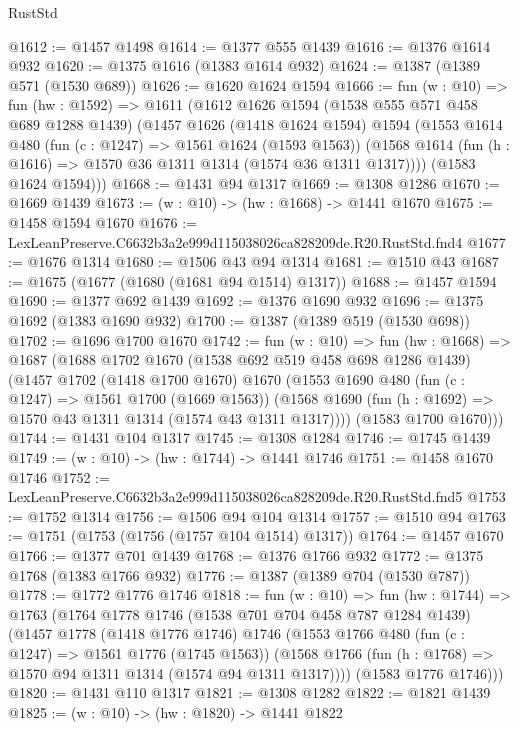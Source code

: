 \begin{lexlean}{RustStd}
\begin{coremodule}
@1612 := @1457 @1498
@1614 := @1377 @555 @1439
@1616 := @1376 @1614 @932
@1620 := @1375 @1616 (@1383 @1614 @932)
@1624 := @1387 (@1389 @571 (@1530 @689))
@1626 := @1620 @1624 @1594
@1666 := fun (w : @10) =>
  fun (hw : @1592) =>
  @1611
    (@1612
      @1626
      @1594
      (@1538 @555 @571 @458 @689 @1288 @1439)
      (@1457
        @1626
        (@1418 @1624 @1594)
        @1594
        (@1553
          @1614
          @480
          (fun (c : @1247) => @1561 @1624 (@1593 @1563))
          (@1568 @1614 (fun (h : @1616) => @1570 @36 @1311 @1314 (@1574 @36 @1311 @1317))))
        (@1583 @1624 @1594)))
@1668 := @1431 @94 @1317
@1669 := @1308 @1286
@1670 := @1669 @1439
@1673 := (w : @10) -> (hw : @1668) -> @1441 @1670
@1675 := @1458 @1594 @1670
@1676 := LexLeanPreserve.C6632b3a2e999d115038026ca828209de.R20.RustStd.fnd4
@1677 := @1676 @1314
@1680 := @1506 @43 @94 @1314
@1681 := @1510 @43
@1687 := @1675 (@1677 (@1680 (@1681 @94 @1514) @1317))
@1688 := @1457 @1594
@1690 := @1377 @692 @1439
@1692 := @1376 @1690 @932
@1696 := @1375 @1692 (@1383 @1690 @932)
@1700 := @1387 (@1389 @519 (@1530 @698))
@1702 := @1696 @1700 @1670
@1742 := fun (w : @10) =>
  fun (hw : @1668) =>
  @1687
    (@1688
      @1702
      @1670
      (@1538 @692 @519 @458 @698 @1286 @1439)
      (@1457
        @1702
        (@1418 @1700 @1670)
        @1670
        (@1553
          @1690
          @480
          (fun (c : @1247) => @1561 @1700 (@1669 @1563))
          (@1568 @1690 (fun (h : @1692) => @1570 @43 @1311 @1314 (@1574 @43 @1311 @1317))))
        (@1583 @1700 @1670)))
@1744 := @1431 @104 @1317
@1745 := @1308 @1284
@1746 := @1745 @1439
@1749 := (w : @10) -> (hw : @1744) -> @1441 @1746
@1751 := @1458 @1670 @1746
@1752 := LexLeanPreserve.C6632b3a2e999d115038026ca828209de.R20.RustStd.fnd5
@1753 := @1752 @1314
@1756 := @1506 @94 @104 @1314
@1757 := @1510 @94
@1763 := @1751 (@1753 (@1756 (@1757 @104 @1514) @1317))
@1764 := @1457 @1670
@1766 := @1377 @701 @1439
@1768 := @1376 @1766 @932
@1772 := @1375 @1768 (@1383 @1766 @932)
@1776 := @1387 (@1389 @704 (@1530 @787))
@1778 := @1772 @1776 @1746
@1818 := fun (w : @10) =>
  fun (hw : @1744) =>
  @1763
    (@1764
      @1778
      @1746
      (@1538 @701 @704 @458 @787 @1284 @1439)
      (@1457
        @1778
        (@1418 @1776 @1746)
        @1746
        (@1553
          @1766
          @480
          (fun (c : @1247) => @1561 @1776 (@1745 @1563))
          (@1568 @1766 (fun (h : @1768) => @1570 @94 @1311 @1314 (@1574 @94 @1311 @1317))))
        (@1583 @1776 @1746)))
@1820 := @1431 @110 @1317
@1821 := @1308 @1282
@1822 := @1821 @1439
@1825 := (w : @10) -> (hw : @1820) -> @1441 @1822

\end{coremodule}
\end{lexlean}

